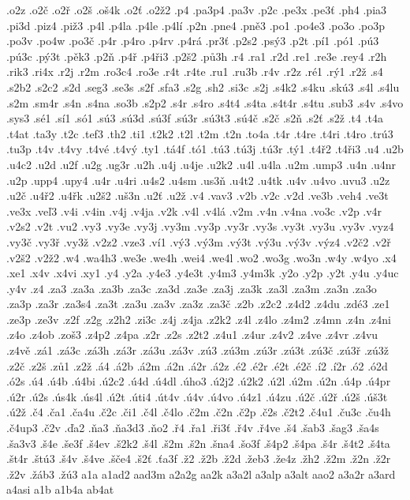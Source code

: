 {.o2z
.o2č
.o2ř
.o2š
.oš4k
.o2ť
.o2ž2
.p4
.pa3p4
.pa3v
.p2c
.pe3x
.pe3ť
.ph4
.pia3
.pi3d
.piz4
.piž3
.p4l
.p4la
.p4le
.p4lí
.p2n
.pne4
.pně3
.po1
.po4e3
.po3o
.po3p
.po3v
.po4w
.po3č
.p4r
.p4ro
.p4rv
.p4rá
.pr3ť
.p2s2
.psý3
.p2t
.pí1
.pó1
.pú3
.pú3c
.pý3t
.pěk3
.p2ň
.p4ř
.p4ři3
.p2š2
.pů3h
.r4
.ra1
.r2d
.re1
.re3e
.rey4
.r2h
.rik3
.ri4x
.r2j
.r2m
.ro3c4
.ro3e
.r4t
.r4te
.ru1
.ru3b
.r4v
.r2z
.ré1
.rý1
.r2ž
.s4
.s2b2
.s2c2
.s2d
.seg3
.se3s
.s2f
.sfa3
.s2g
.sh2
.si3c
.s2j
.s4k2
.s4ku
.skú3
.s4l
.s4lu
.s2m
.sm4r
.s4n
.s4na
.so3b
.s2p2
.s4r
.s4ro
.s4t4
.s4ta
.s4t4r
.s4tu
.sub3
.s4v
.s4vo
.sys3
.sé1
.sí1
.só1
.sú3
.sú3d
.sú3f
.sú3r
.sú3t3
.sú4č
.s2č
.s2ň
.s2ť
.s2ž
.t4
.t4a
.t4at
.ta3y
.t2c
.tef3
.th2
.ti1
.t2k2
.t2l
.t2m
.t2n
.to4a
.t4r
.t4re
.t4ri
.t4ro
.trú3
.tu3p
.t4v
.t4vy
.t4vé
.t4vý
.ty1
.tá4f
.tó1
.tú3
.tú3j
.tú3r
.tý1
.t4ř2
.t4ři3
.u4
.u2b
.u4c2
.u2d
.u2f
.u2g
.ug3r
.u2h
.u4j
.u4je
.u2k2
.u4l
.u4la
.u2m
.ump3
.u4n
.u4nr
.u2p
.upp4
.upy4
.u4r
.u4ri
.u4s2
.u4sm
.us3ň
.u4t2
.u4tk
.u4v
.u4vo
.uvu3
.u2z
.u2č
.u4ř2
.u4řk
.u2š2
.uš3n
.u2ť
.u2ž
.v4
.vav3
.v2b
.v2c
.v2d
.ve3b
.veh4
.ve3t
.ve3x
.veľ3
.v4i
.v4in
.v4j
.v4ja
.v2k
.v4l
.v4lá
.v2m
.v4n
.v4na
.vo3c
.v2p
.v4r
.v2s2
.v2t
.vu2
.vy3
.vy3e
.vy3j
.vy3m
.vy3p
.vy3r
.vy3s
.vy3t
.vy3u
.vy3v
.vyz4
.vy3č
.vy3ř
.vy3ž
.v2z2
.vze3
.ví1
.vý3
.vý3m
.vý3t
.vý3u
.vý3v
.výz4
.v2č2
.v2ř
.v2š2
.v2ž2
.w4
.wa4h3
.we3e
.we4h
.wei4
.we4l
.wo2
.wo3g
.wo3n
.w4y
.w4yo
.x4
.xe1
.x4v
.x4vi
.xy1
.y4
.y2a
.y4e3
.y4e3t
.y4m3
.y4m3k
.y2o
.y2p
.y2t
.y4u
.y4uc
.y4v
.z4
.za3
.za3a
.za3b
.za3c
.za3d
.za3e
.za3j
.za3k
.za3l
.za3m
.za3n
.za3o
.za3p
.za3r
.za3s4
.za3t
.za3u
.za3v
.za3z
.za3č
.z2b
.z2c2
.z4d2
.z4du
.zdé3
.ze1
.ze3p
.ze3v
.z2f
.z2g
.z2h2
.zi3c
.z4j
.z4ja
.z2k2
.z4l
.z4lo
.z4m2
.z4mn
.z4n
.z4ni
.z4o
.z4ob
.zoš3
.z4p2
.z4pa
.z2r
.z2s
.z2t2
.z4u1
.z4ur
.z4v2
.z4ve
.z4vr
.z4vu
.z4vě
.zá1
.zá3c
.zá3h
.zá3r
.zá3u
.zá3v
.zú3
.zú3m
.zú3r
.zú3t
.zú3č
.zú3ř
.zú3ž
.z2č
.z2š
.zů1
.z2ž
.á4
.á2b
.á2m
.á2n
.á2r
.á2z
.é2
.é2r
.é2t
.é2č
.í2
.í2r
.ó2
.ó2d
.ó2s
.ú4
.ú4b
.ú4bi
.ú2c2
.ú4d
.ú4dl
.úho3
.ú2j2
.ú2k2
.ú2l
.ú2m
.ú2n
.ú4p
.ú4pr
.ú2r
.ú2s
.ús4k
.ús4l
.ú2t
.úti4
.út4v
.ú4v
.ú4vo
.ú4z1
.ú4zu
.ú2č
.ú2ř
.ú2š
.úš3t
.ú2ž
.č4
.ča1
.ča4u
.č2c
.či1
.č4l
.č4lo
.č2m
.č2n
.č2p
.č2s
.č2t2
.č4u1
.ču3c
.ču4h
.č4up3
.č2v
.ďa2
.ňa3
.ňa3d3
.ňo2
.ř4
.řa1
.ři3ť
.ř4v
.ř4ve
.š4
.šab3
.šag3
.ša4s
.ša3v3
.š4e
.še3f
.š4ev
.š2k2
.š4l
.š2m
.š2n
.šna4
.šo3f
.š4p2
.š4pa
.š4r
.š4t2
.š4ta
.št4r
.štú3
.š4v
.š4ve
.šče4
.š2ť
.ťa3f
.ž2
.ž2b
.ž2d
.žeb3
.že4z
.žh2
.ž2m
.ž2n
.ž2r
.ž2v
.žáb3
.žú3
a1a
a1ad2
aad3m
a2a2g
aa2k
a3a2l
a3alp
a3alt
aao2
a3a2r
a3ard
a4asi
a1b
a1b4a
ab4at
}
